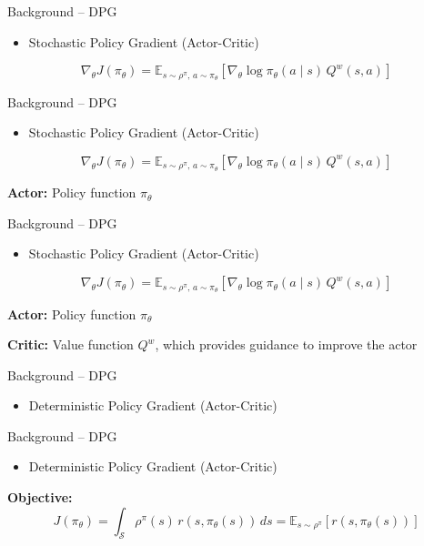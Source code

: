\begin{frame}{Background -- DPG}
\begin{itemize}
    \item Stochastic Policy Gradient (Actor-Critic)
\end{itemize}
\[
\nabla_\theta J(\pi_\theta) = \mathbb{E}_{s \sim \rho^\pi,\, a \sim \pi_\theta}\!\left[ \nabla_\theta \log \pi_\theta(a \mid s)\, Q^{w}(s, a) \right]
\]
\end{frame}

\begin{frame}{Background -- DPG}
\begin{itemize}
    \item Stochastic Policy Gradient (Actor-Critic)
\end{itemize}
\[
\nabla_\theta J(\pi_\theta) = \mathbb{E}_{s \sim \rho^\pi,\, a \sim \pi_\theta}\!\left[ \nabla_\theta \log \pi_\theta(a \mid s)\, Q^{w}(s, a) \right]
\]

\textbf{Actor:} Policy function $\pi_\theta$
\end{frame}

\begin{frame}{Background -- DPG}
\begin{itemize}
    \item Stochastic Policy Gradient (Actor-Critic)
\end{itemize}
\[
\nabla_\theta J(\pi_\theta) = \mathbb{E}_{s \sim \rho^\pi,\, a \sim \pi_\theta}\!\left[ \nabla_\theta \log \pi_\theta(a \mid s)\, Q^{w}(s, a) \right]
\]

\textbf{Actor:} Policy function $\pi_\theta$

\textbf{Critic:} Value function $Q^{w}$, which provides guidance to improve the actor
\end{frame}
\begin{frame}{Background -- DPG}
\begin{itemize}
    \item Deterministic Policy Gradient (Actor-Critic)
\end{itemize}
\end{frame}

\begin{frame}{Background -- DPG}
\begin{itemize}
    \item Deterministic Policy Gradient (Actor-Critic)
\end{itemize}
\vspace{0.5em}
\textbf{Objective:}
\[
J(\pi_\theta) = \int_{\mathcal{S}} \rho^{\pi}(s)\, r(s, \pi_\theta(s))\, ds = \mathbb{E}_{s \sim \rho^\pi}\!\left[ r(s, \pi_\theta(s)) \right]
\]
\end{frame}

